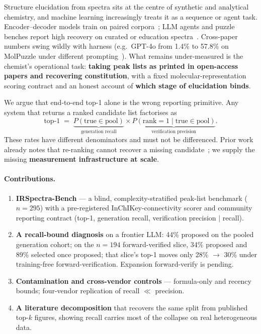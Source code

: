 \documentclass{article}
\begin{document}
Structure elucidation from spectra sits at the centre of synthetic and analytical chemistry,
and machine learning increasingly treats it as a sequence or agent task.
Encoder--decoder models train on paired corpora~\citep{chacko2024spectro,ottomano2025nmiracle,alberts2024ir};
LLM agents and puzzle benches report high recovery on curated or education
spectra~\citep{kamber2026chemist,guo2024molpuzzle,zhuang2025treesearch,espejo2026agentic}.
Cross-paper numbers swing wildly with harness (e.g.\ GPT-4o from 1.4\% to 57.8\% on MolPuzzle
under different prompting~\citep{guo2024molpuzzle,zhuang2025treesearch}).
What remains under-measured is the chemist's operational task: \textbf{taking peak lists as
printed in open-access papers and recovering constitution}, with a fixed molecular-representation
scoring contract and an honest account of \textbf{which stage of elucidation binds}.

We argue that end-to-end top-1 alone is the wrong reporting primitive.
Any system that returns a ranked candidate list factorises as
\begin{equation}
\text{top-1} \;=\; \underbrace{P(\text{true} \in \text{pool})}_{\text{generation recall}}
\times
\underbrace{P(\text{rank}=1 \mid \text{true} \in \text{pool})}_{\text{verification precision}}.
\end{equation}
These rates have different denominators and must not be differenced.
Prior work already notes that re-ranking cannot recover a missing
candidate~\citep{priessner2026reasoning}; we supply the missing \textbf{measurement
infrastructure at scale}.

\paragraph{Contributions.}
\begin{enumerate}
  \item \textbf{IRSpectra-Bench} --- a blind, complexity-stratified peak-list benchmark ($n{=}295$)
        with a pre-registered InChIKey-connectivity scorer and community reporting contract
        (top-1, generation recall, verification precision $|$ recall).
  \item \textbf{A recall-bound diagnosis} on a frontier LLM: 44\% proposed on the pooled generation
        cohort; on the $n{=}194$ forward-verified slice, 34\% proposed and 89\% selected once
        proposed; that slice's top-1 moves only 28\% $\to$ 30\% under training-free
        forward-verification. Expansion forward-verify is pending.
  \item \textbf{Contamination and cross-vendor controls} --- formula-only and recency bounds;
        four-vendor replication of recall $\ll$ precision.
  \item \textbf{A literature decomposition} that recovers the same split from published top-$k$
        figures, showing recall carries most of the collapse on real heterogeneous data.
\end{enumerate}
\end{document}
